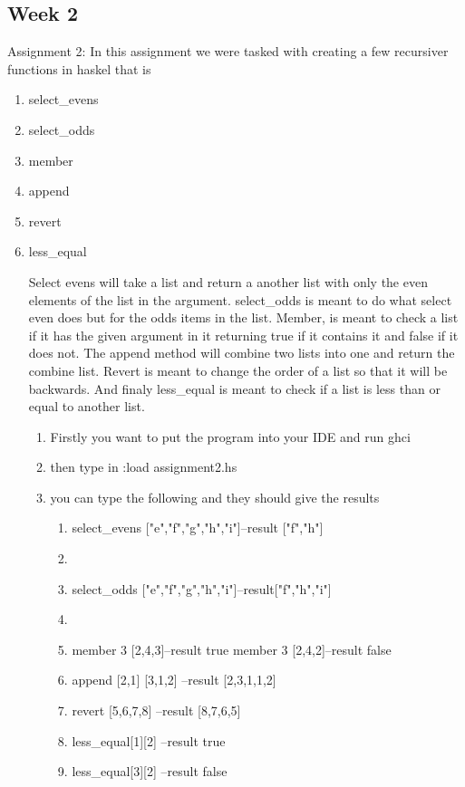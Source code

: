 \documentclass{article}
\theoremstyle{theorem}
\theoremstyle{definition}
\theoremstyle{remark}
\begin{document}
\subsection{Week 2}
 Assignment 2: In this assignment we were tasked with creating a few recursiver functions in haskel that is

\begin{enumerate}

\item select_evens
\item select_odds
\item member
\item append
\item revert
\item less_equal

Select evens will take a list and return a another list with only the even elements of the list in the argument. select_odds is meant to do what select even does but for the odds items in the list. Member, is meant to check a list if it has the given argument in it returning true if it contains it and false if it does not. The append method will combine two lists into one and return the combine list. Revert is meant to change the order of a list so that it will be backwards. And finaly less_equal is meant to check if a list is less than or equal to another list.
\begin{enumerate}

\item Firstly you want to put the program into your IDE and run ghci
\item then type in  :load assignment2.hs
\item you can type the following  and they should give the results
   \begin{enumerate}

\item select_evens ["e","f","g","h","i"]--result ["f","h"]
\item
\item select_odds ["e","f","g","h","i"]--result["f","h","i"]
\item
\item member 3 [2,4,3]--result true member 3 [2,4,2]--result false
\item
append [2,1] [3,1,2]
--result [2,3,1,1,2]
\item revert [5,6,7,8]
--result [8,7,6,5]
\item less_equal[1][2]
--result true
\item less_equal[3][2]
--result false


\end{enumerate}
\end{enumerate}
\end{enumerate}
\end{document}
